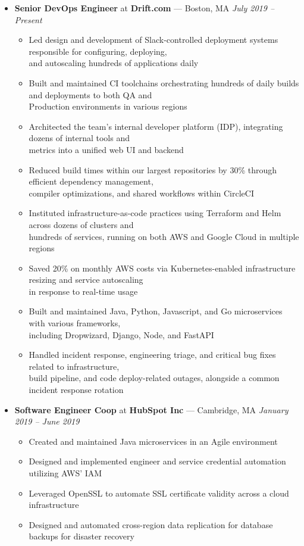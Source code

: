 \documentclass{article}
\begin{document}
\begin{itemize}[label={},leftmargin=*]
  \item \textbf{Senior DevOps Engineer} at \textbf{Drift.com} --- Boston, MA \hfill {\em July 2019 -- Present}
  \begin{itemize}[label={$\bullet$}]
    \item Led design and development of Slack-controlled deployment systems responsible for configuring, deploying,\\
          and autoscaling hundreds of applications daily
    \item Built and maintained CI toolchains orchestrating hundreds of daily builds and deployments to both QA and\\
          Production environments in various regions
    \item Architected the team's internal developer platform (IDP), integrating dozens of internal tools and\\
          metrics into a unified web UI and backend
    \item Reduced build times within our largest repositories by 30\% through efficient dependency management,\\
          compiler optimizations, and shared workflows within CircleCI
    \item Instituted infrastructure-as-code practices using Terraform and Helm across dozens of clusters and\\
          hundreds of services, running on both AWS and Google Cloud in multiple regions
    \item Saved 20\% on monthly AWS costs via Kubernetes-enabled infrastructure resizing and service autoscaling\\
          in response to real-time usage
    \item Built and maintained Java, Python, Javascript, and Go microservices with various frameworks,\\ 
          including Dropwizard, Django, Node, and FastAPI
    \item Handled incident response, engineering triage, and critical bug fixes related to infrastructure,\\ 
          build pipeline, and code deploy-related outages, alongside a common incident response rotation
  \end{itemize}

  \item \textbf{Software Engineer Coop} at \textbf{HubSpot Inc} --- Cambridge, MA \hfill {\em January 2019 -- June 2019}
  \begin{itemize}[label={$\bullet$}]
    \item Created and maintained Java microservices in an Agile environment
    \item Designed and implemented engineer and service credential automation utilizing AWS' IAM
    \item Leveraged OpenSSL to automate SSL certificate validity across a cloud infrastructure
    \item Designed and automated cross-region data replication for database backups for disaster recovery


\end{itemize}
\end{itemize}
\end{document}
